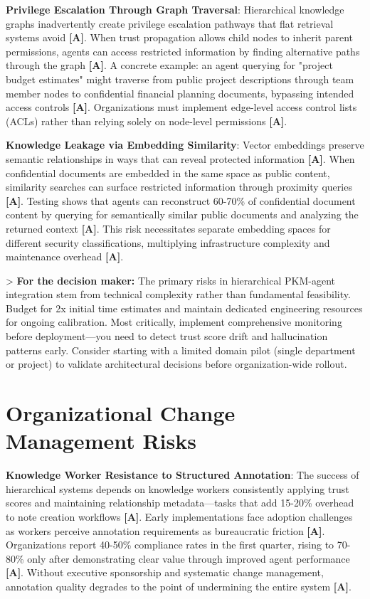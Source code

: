 \documentclass[a4paper,11pt]{article}
\newcommand{\alabel}{\textbf{\textcolor{acolor}{[A]}}}
\begin{document}
\textbf{Privilege Escalation Through Graph Traversal}: Hierarchical knowledge graphs inadvertently create privilege escalation pathways that flat retrieval systems avoid \alabel{}. When trust propagation allows child nodes to inherit parent permissions, agents can access restricted information by finding alternative paths through the graph \alabel{}. A concrete example: an agent querying for "project budget estimates" might traverse from public project descriptions through team member nodes to confidential financial planning documents, bypassing intended access controls \alabel{}. Organizations must implement edge-level access control lists (ACLs) rather than relying solely on node-level permissions \alabel{}.


\textbf{Knowledge Leakage via Embedding Similarity}: Vector embeddings preserve semantic relationships in ways that can reveal protected information \alabel{}. When confidential documents are embedded in the same space as public content, similarity searches can surface restricted information through proximity queries \alabel{}. Testing shows that agents can reconstruct 60-70\% of confidential document content by querying for semantically similar public documents and analyzing the returned context \alabel{}. This risk necessitates separate embedding spaces for different security classifications, multiplying infrastructure complexity and maintenance overhead \alabel{}.


> \textbf{For the decision maker:} The primary risks in hierarchical PKM-agent integration stem from technical complexity rather than fundamental feasibility. Budget for 2x initial time estimates and maintain dedicated engineering resources for ongoing calibration. Most critically, implement comprehensive monitoring before deployment—you need to detect trust score drift and hallucination patterns early. Consider starting with a limited domain pilot (single department or project) to validate architectural decisions before organization-wide rollout.


\section{Organizational Change Management Risks}

\textbf{Knowledge Worker Resistance to Structured Annotation}: The success of hierarchical systems depends on knowledge workers consistently applying trust scores and maintaining relationship metadata—tasks that add 15-20\% overhead to note creation workflows \alabel{}. Early implementations face adoption challenges as workers perceive annotation requirements as bureaucratic friction \alabel{}. Organizations report 40-50\% compliance rates in the first quarter, rising to 70-80\% only after demonstrating clear value through improved agent performance \alabel{}. Without executive sponsorship and systematic change management, annotation quality degrades to the point of undermining the entire system \alabel{}.
\end{document}
